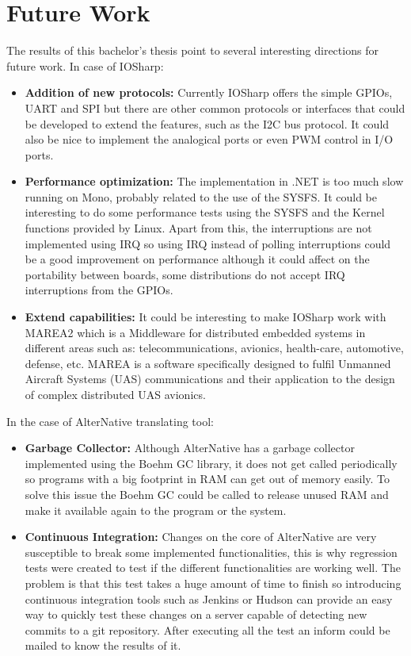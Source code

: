 \section{Future Work}\label{S:Future-Work}
The results of this bachelor's thesis point to several interesting directions for future work.
In case of IOSharp:
\begin{itemize}
\item \textbf{Addition of new protocols:} Currently IOSharp offers the simple GPIOs, UART and SPI but there are other common protocols or interfaces that could be developed to extend the features, such as the \gls{I2C} bus protocol. It could also be nice to implement the analogical ports or even \gls{PWM} control in I/O ports.

\item \textbf{Performance optimization:} The implementation in .NET is too much slow running on Mono, probably related to the use of the \gls{SYSFS}. It could be interesting to do some performance tests using the \gls{SYSFS} and the Kernel functions provided by Linux. Apart from this, the interruptions are not implemented using \gls{IRQ} so using \gls{IRQ} instead of polling interruptions could be a good improvement on performance although it could affect on the portability between boards, some distributions do not accept IRQ interruptions from the GPIOs.

\item \textbf{Extend capabilities:} It could be interesting to make IOSharp work with MAREA2 which is a Middleware for distributed embedded systems in different areas such as: telecommunications, avionics, health-care, automotive, defense, etc. MAREA is a software specifically designed to fulfil Unmanned Aircraft Systems (UAS) communications and their application to the design of complex distributed UAS avionics.
\end{itemize}

In the case of AlterNative translating tool:
\begin{itemize}
\item \textbf{Garbage Collector:} Although AlterNative has a garbage collector implemented using the Boehm GC library, it does not get called periodically so programs with a big footprint in RAM can get out of memory easily. To solve this issue the Boehm GC could be called to release unused RAM and make it available again to the program or the system.

\item \textbf{Continuous Integration:} Changes on the core of AlterNative are very susceptible to break some implemented functionalities, this is why regression tests were created to test if the different functionalities are working well. The problem is that this test takes a huge amount of time to finish so introducing continuous integration tools such as Jenkins or Hudson can provide an easy way to quickly test these changes on a server capable of detecting new commits to a git repository. After executing all the test an inform could be mailed to know the results of it.
\end{itemize}

